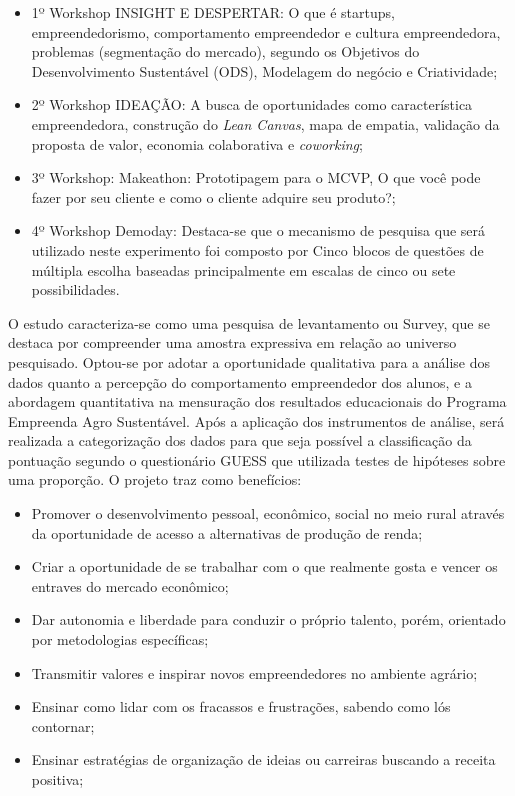 \begin{itemize}

\item {1º Workshop INSIGHT E DESPERTAR: O que é startups, empreendedorismo, comportamento empreendedor e cultura empreendedora, problemas (segmentação do mercado), segundo os Objetivos do Desenvolvimento Sustentável (ODS), Modelagem do negócio e Criatividade;}
\item {2º Workshop IDEAÇÃO: A busca de oportunidades como característica empreendedora, construção do \textit{Lean Canvas}, mapa de empatia, validação da proposta de valor, economia colaborativa e \textit{coworking};}

\item {3º Workshop: Makeathon: Prototipagem para o MCVP, O que você pode fazer por seu cliente e como o cliente adquire seu produto?;}
\item {4º Workshop Demoday: Destaca-se que o mecanismo de pesquisa que será utilizado neste experimento foi composto por Cinco blocos de questões de múltipla escolha baseadas principalmente em escalas de cinco ou sete possibilidades.}
\end{itemize}

O estudo caracteriza-se como uma pesquisa de levantamento ou Survey, que se destaca por compreender uma amostra expressiva em relação ao universo pesquisado. Optou-se por adotar a oportunidade qualitativa para a análise dos dados quanto a percepção do comportamento empreendedor dos alunos, e a abordagem quantitativa na mensuração dos resultados educacionais do Programa Empreenda Agro Sustentável. Após a aplicação dos instrumentos de análise, será realizada a categorização dos dados para que seja possível a classificação da pontuação segundo o questionário GUESS que utilizada testes de hipóteses sobre uma proporção. O projeto traz como benefícios: 

\begin{itemize}
\item{Promover o desenvolvimento pessoal, econômico, social no meio rural através da oportunidade de acesso a alternativas de produção de renda;}
\item{Criar a oportunidade de se trabalhar com o que realmente gosta e vencer os entraves do mercado econômico;}
\item{Dar autonomia e liberdade para conduzir o próprio talento, porém, orientado por metodologias específicas;}
\item{Transmitir valores e inspirar novos empreendedores no ambiente agrário;}
\item{Ensinar como lidar com os fracassos e frustrações, sabendo como lós contornar;}
\item{Ensinar estratégias de organização de ideias ou carreiras buscando a receita positiva;}
\end{itemize}




